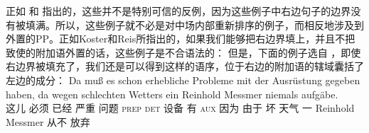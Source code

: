 \begin{enumerate}
{%
\zl
	正如 \citet[\S~6]{Koster75a}和 \citet*[]{Reis80a} 指出的，这些并不是特别可信的反例，因为这些例子中右边句子的边界没有被填满。所以，这些例子就不必是对中场内部重新排序的例子，而相反地涉及到外置的PP。正如Koster和Reis所指出的，如果我们能够把右边界填上，并且不把致使的附加语外置的话，这些例子是不合语法的：
\eal
{}
\zl
但是，下面的例子选自 \citet[]{Crysmann2004a} ，即使右边界被填充了，我们还是可以得到这样的语序，位于右边的附加语的辖域囊括了左边的成分：
\ea
\gll Da muß es schon erhebliche Probleme mit der Ausrüstung gegeben haben, da wegen schlechten
  Wetters ein Reinhold Messmer niemals aufgäbe.\\
  这儿 必须 \expl{} 已经 严重 问题 \textsc{prep} \textsc{det} 设备 有 \textsc{aux} 因为 由于 坏 天气 一 Reinhold Messmer 从不
  放弃\\
}
\end{enumerate}
